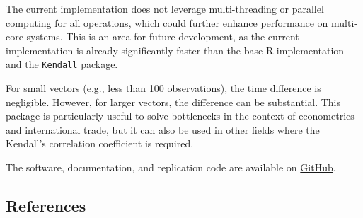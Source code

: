 \documentclass[
  10pt,
  letterpaper,
]{article}
\begin{document}
The current implementation does not leverage multi-threading or parallel
computing for all operations, which could further enhance performance on
multi-core systems. This is an area for future development, as the
current implementation is already significantly faster than the base R
implementation and the \texttt{Kendall} package.

For small vectors (e.g., less than 100 observations), the time
difference is negligible. However, for larger vectors, the difference
can be substantial. This package is particularly useful to solve
bottlenecks in the context of econometrics and international trade, but
it can also be used in other fields where the Kendall's correlation
coefficient is required.

The software, documentation, and replication code are available on
\href{https://github.com/pachadotdev/kendallknight}{GitHub}.

\subsection*{References}\label{references}
\end{document}
